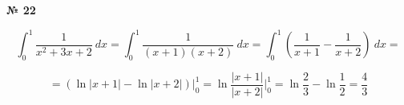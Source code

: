 \documentclass{article}
\begin{document}
\textbf{№ 22} 
\large

$$ \int_{0}^{1} \frac{1}{x^2+3x+2} \ dx 
= \int_{0}^{1} \frac{1}{(x+1)(x+2)} \ dx 
= \int_{0}^{1} \left( \frac{1}{x+1} - \frac{1}{x+2} \right) \ dx
= $$

$$ = \left( \ln{\left| x+1 \right|} - \ln{\left| x+2 \right|} \right) \bigg\vert_{0}^{1}
= \ln{\frac{\left| x+1 \right|}{\left| x+2 \right|}} \bigg\vert_{0}^{1}
= \ln{\frac{2}{3}} - \ln{\frac{1}{2}}
= \frac{4}{3} $$
\end{document}
